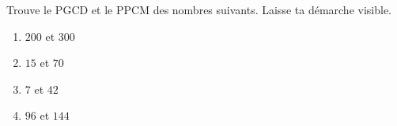 %
%
    Trouve le PGCD et le PPCM des nombres suivants. Laisse ta démarche visible.
    \begin{enumerate}[cols=4]
        \item $200$ et $300$
        \item $15$ et $ 70$
        \item $7$ et $42$
        \item $96$ et $144$
    \end{enumerate}
